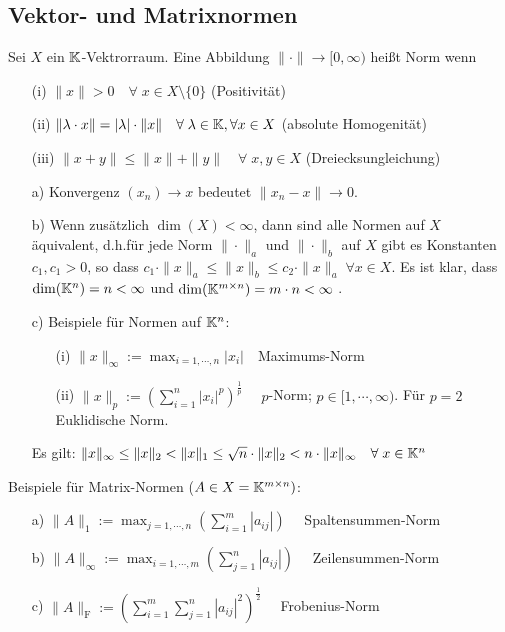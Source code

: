 \subsection{Vektor- und Matrixnormen}
\begin{Definition} [Norm]
  Sei $X$ ein $\mathbb K$-Vektrorraum. Eine Abbildung $\| \cdot \| \rightarrow [0, \infty)$
  heißt Norm wenn
  \begin{enumerate}
    \item[(i)]    $\|x\| > 0 \quad \forall \; x \in X \setminus \lbrace 0 \rbrace$ (Positivität)
    \item[(ii)]   $\| \lambda \cdot x\| = |\lambda| \cdot \|x\| \quad \forall \; \lambda \in \mathbb K, \forall x \in X$ (absolute Homogenität)
    \item[(iii)]  $\|x + y \| \le \|x\| + \|y\| \quad \forall \; x, y \in X$ (Dreiecksungleichung)
  \end{enumerate}
\end{Definition}

\begin{Bemerkungen}
\quad
  \begin{enumerate}
    \item[a)] Konvergenz $(x_n) \rightarrow x$ bedeutet $\|x_n - x\| \rightarrow 0$.
    \item[b)] Wenn zusätzlich $\dim (X) < \infty$, dann sind alle Normen auf $X$
    äquivalent, d.h.für jede Norm $\| \cdot \|_a$ und $\| \cdot \|_b$ auf $X$ gibt
    es Konstanten $c_1, c_1 > 0$, so dass
    $c_1 \cdot \| x \|_a \le \| x \|_b \le c_2 \cdot \| x \|_a \; \forall x \in X$.
    Es ist klar, dass $\dim(\mathbb K^n) = n < \infty$ und
    $\dim(\mathbb K^{m \times n}) = m \cdot n  < \infty$ .
    \item[c)] Beispiele für Normen auf $\mathbb K^n$:
    \begin{enumerate}
      \item[(i)] $\|x\|_\infty := \max_{i = 1, \cdots , n} |x_i| \quad $Maximums-Norm
      \item[(ii)] $\|x\|_p := \left( \sum_{i = 1}^n |x_i|^p \right)^\frac{1}{p} \quad$
      $p$-Norm; $p \in [1, \cdots , \infty)$. Für $p = 2$ Euklidische Norm.
    \end{enumerate}
    Es gilt:
    $\|x\|_\infty \le \|x\|_2 < \|x\|_1 \le \sqrt{n} \cdot \|x\|_2 < n \cdot \|x\|_\infty
    \quad \forall \; x \in \mathbb K^n$
  \end{enumerate}
\end{Bemerkungen}

Beispiele für Matrix-Normen ($A \in X = \mathbb K^{m \times n})$:
\begin{enumerate}
  \item[a)] $\|A\|_1 :=  \max_{j = 1, \cdots , n} \left( \sum_{i = 1}^m |a_{ij}| \right) \quad$ Spaltensummen-Norm
  \item[b)] $\|A\|_\infty :=  \max_{i = 1, \cdots , m} \left( \sum_{j = 1}^n |a_{ij}| \right) \quad$ Zeilensummen-Norm
  \item[c)] $\|A\|_{\text{F}} :=  \left(\sum_{i = 1}^m  \sum_{j = 1}^n |a_{ij}|^2 \right)^{\frac{1}{2}} \quad$
  Frobenius-Norm
\end{enumerate}

